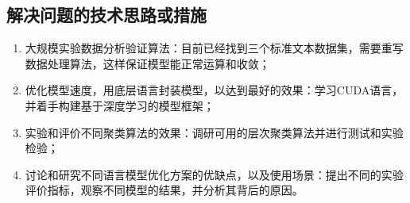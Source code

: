 \documentclass[master,openright,twoside,color]{buaathesis}
\begin{document}
\subsection{解决问题的技术思路或措施}
\begin{enumerate}
\item 大规模实验数据分析验证算法：目前已经找到三个标准文本数据集，需要重写数据处理算法，这样保证模型能正常运算和收敛；
\item 优化模型速度，用底层语言封装模型，以达到最好的效果：学习CUDA语言，并着手构建基于深度学习的模型框架；
\item 实验和评价不同聚类算法的效果：调研可用的层次聚类算法并进行测试和实验检验；
\item 讨论和研究不同语言模型优化方案的优缺点，以及使用场景：提出不同的实验评价指标，观察不同模型的结果，并分析其背后的原因。
\end{enumerate}
\cleardoublepage
{}
{}
\nocite{*}

\cleardoublepage

\appendix



\backmatter




\end{document}

